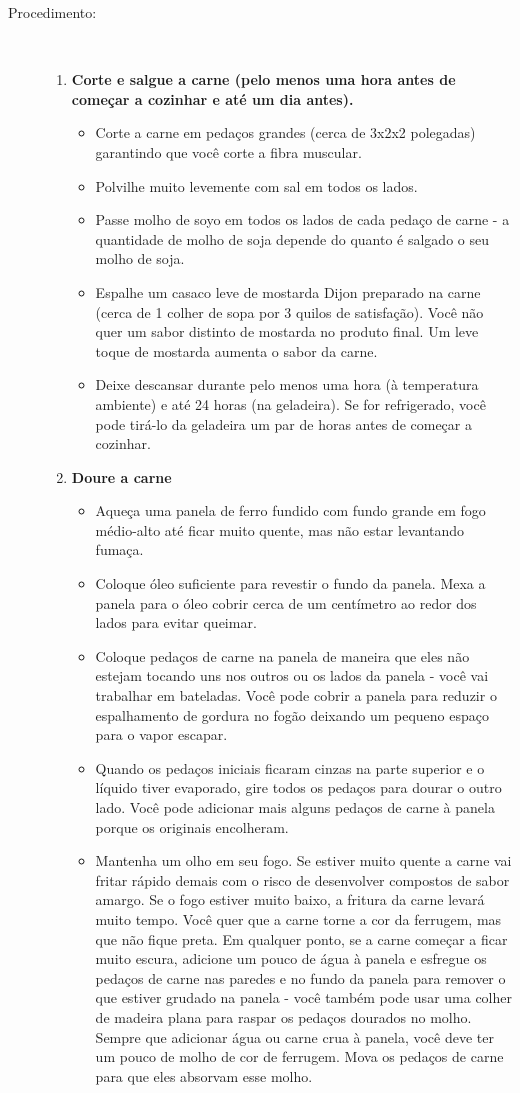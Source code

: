 \documentclass [11pt, letterpaper] {article}
\begin{document}
\begin {description}
\item [Procedimento:] \ \\
\begin {enumerate}
\item {\bf Corte e salgue a carne (pelo menos uma hora antes de começar a cozinhar e até um dia antes).}
\begin {itemize}
\item Corte a carne em pedaços grandes (cerca de 3x2x2 polegadas) garantindo que você corte a fibra muscular.
\item Polvilhe muito levemente com sal em todos os lados.
\item Passe molho de soyo em todos os lados de cada pedaço de carne - a quantidade de molho de soja depende do quanto é salgado o seu molho de soja.
\item Espalhe um casaco leve de mostarda Dijon preparado na carne (cerca de 1 colher de sopa por 3 quilos de satisfação). Você não quer um sabor distinto de mostarda no produto final. Um leve toque de mostarda aumenta o sabor da carne.
\item Deixe descansar durante pelo menos uma hora (à temperatura ambiente) e até 24 horas (na geladeira). Se for refrigerado, você pode tirá-lo da geladeira um par de horas antes de começar a cozinhar.
\end {itemize}
\item {\bf Doure a carne}
\begin {itemize}
\item Aqueça uma panela de ferro fundido com fundo grande em fogo médio-alto até ficar muito quente, mas não estar levantando fuma\c{c}a.
\item Coloque óleo suficiente para revestir o fundo da panela. Mexa a panela para o \'oleo cobrir cerca de um cent\'imetro ao redor dos lados para evitar queimar.
\item Coloque pedaços de carne na panela de maneira que eles não estejam tocando uns nos outros ou os lados da panela - você vai trabalhar em bateladas. Você pode cobrir a panela para reduzir o espalhamento de gordura no fog\~ao deixando um pequeno espaço para o vapor escapar.
\item Quando os peda\c{c}os iniciais ficaram cinzas na parte superior e o líquido tiver evaporado, gire todos os peda\c{c}os para dourar o outro lado. Você pode adicionar mais alguns pedaços de carne à panela porque os originais encolheram.
\item Mantenha um olho em seu fogo. Se estiver muito quente a carne vai fritar rápido demais com o risco de desenvolver compostos de sabor amargo. Se o fogo estiver muito baixo, a fritura da carne levará muito tempo. Você quer que a carne torne a cor da ferrugem, mas que não fique preta. Em qualquer ponto, se a carne come\c{c}ar a ficar muito escura, adicione um pouco de água à panela e esfregue os pedaços de carne nas paredes e no fundo da panela para remover o que estiver grudado na panela - você também pode usar uma colher de madeira plana para raspar os pedaços dourados no molho. Sempre que adicionar água ou carne crua à panela, você deve ter um pouco de molho de cor de ferrugem. Mova os pedaços de carne para que eles absorvam esse molho.

\end{itemize}
\end{enumerate}
\end{description}
\end{document}
